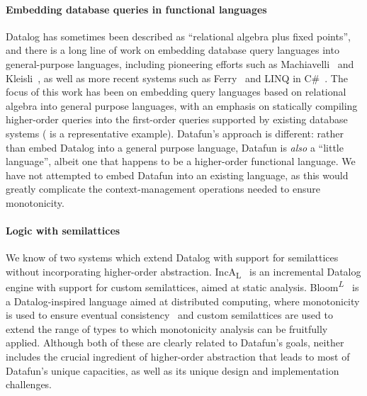 
\paragraph{Embedding database queries in functional languages}

Datalog has sometimes been described as ``relational algebra plus fixed
points'', and there is a long line of work on embedding database query languages
into general-purpose languages, including pioneering efforts such as
Machiavelli~\citep{machiavelli} and Kleisli~\citep{kleisli}, as well as more
recent systems such as Ferry~\citep{ferry} and LINQ in C\#~\citep{linq-wadler}.
%
The focus of this work has been on embedding query languages based
on relational algebra into general purpose languages, with an emphasis
on statically compiling higher-order queries into the first-order
queries supported by existing database systems (\citet{query-shredding} is a
representative example).
%
Datafun's approach is different: rather than embed Datalog into a general
purpose language, Datafun is \emph{also} a ``little language'', albeit one that
happens to be a higher-order functional language. We have not attempted to embed
Datafun into an existing language, as this would greatly complicate the
context-management operations needed to ensure monotonicity.



\paragraph{Logic with semilattices}  We know of two systems which extend Datalog with support for semilattices without incorporating higher-order abstraction.
%
IncA\textsubscript{L}~\citep{DBLP:journals/pacmpl/SzaboBEV18} is an incremental Datalog engine with support for custom semilattices, aimed at static analysis.
%
Bloom\textsuperscript{$L$}~\citep{DBLP:conf/cloud/ConwayMAHM12} is a Datalog-inspired language aimed at distributed computing, where monotonicity is used to ensure eventual consistency~\citep{bloom} and custom semilattices are used to extend the range of types to which monotonicity analysis can be fruitfully applied.
%
Although both of these are clearly related to Datafun's goals, neither includes the crucial ingredient of higher-order abstraction that leads to most of Datafun's unique capacities, as well as its unique design and implementation challenges.

